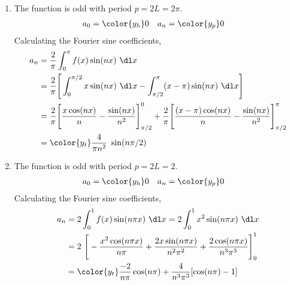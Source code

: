 \begin{enumerate}
    \item The function is odd with period $ p = 2L = 2\pi $.
          \begin{align}
              a_0 & = \color{y_h} 0 &
              a_n & = \color{y_p} 0
          \end{align}
          Calculating the Fourier sine coefficients,
          \begin{align}
              a_n & = \frac{2}{\pi} \int_{0}^{\pi} f(x) \sin(nx)\ \dl x               \\
                  & = \frac{2}{\pi} \Bigg[ \int_{0}^{\pi/2} x \sin(nx)\ \dl x
              - \int_{\pi/2}^{\pi} (x-\pi) \sin(nx)\ \dl x \Bigg]                     \\
                  & = \frac{2}{\pi} \Bigg[ \frac{x\cos(nx)}{n} - \frac{\sin(nx)}{n^2}
                  \Bigg]_{\pi/2}^{0} + \frac{2}{\pi} \Bigg[
              \frac{(x-\pi)\cos(nx)}{n} - \frac{\sin(nx)}{n^2} \Bigg]_{\pi/2}^{\pi}   \\
                  & = \color{y_t} \frac{4}{\pi n^2}\ \sin(n\pi/2)
          \end{align}

    \item The function is odd with period $ p = 2L = 2 $.
          \begin{align}
              a_0 & = \color{y_h} 0 &
              a_n & = \color{y_p} 0
          \end{align}
          Calculating the Fourier sine coefficients,
          \begin{align}
              a_n & = 2 \int_{0}^{1} f(x) \sin(n\pi x)\ \dl x
              = 2 \int_{0}^{1} x^2 \sin(n\pi x)\ \dl x                             \\
                  & = 2\ \Bigg[ -\frac{x^2 \cos(n\pi x)}{n\pi}
                  + \frac{2x\sin(n\pi x)}{n^2 \pi^2}
              + \frac{2\cos(n\pi x)}{n^3 \pi^3}\Bigg]_0^1                          \\
                  & = \color{y_t} \frac{-2}{n\pi} \cos(n\pi) + \frac{4}{n^3 \pi^3}
              [\cos(n\pi) - 1]
          \end{align}


\end{enumerate}
